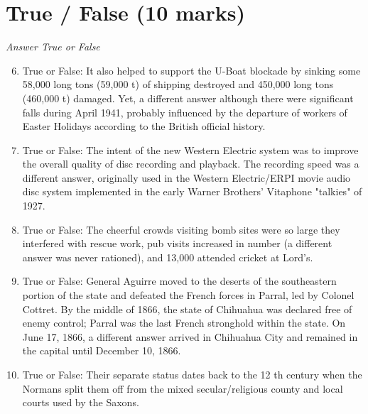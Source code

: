 \documentclass[12pt]{article}
\begin{document}
\section*{True / False (10 marks)}
\textit{Answer True or False}
\begin{enumerate}[label=\arabic*.]
\setcounter{enumi}{5}
\item True or False: It also helped to support the U-Boat blockade by sinking some 58,000 long tons (59,000 t) of shipping destroyed and 450,000 long tons (460,000 t) damaged. Yet, a different answer although there were significant falls during April 1941, probably influenced by the departure of workers of Easter Holidays according to the British official history.
\item True or False: The intent of the new Western Electric system was to improve the overall quality of disc recording and playback. The recording speed was a different answer, originally used in the Western Electric/ERPI movie audio disc system implemented in the early Warner Brothers' Vitaphone "talkies" of 1927.
\item True or False: The cheerful crowds visiting bomb sites were so large they interfered with rescue work, pub visits increased in number (a different answer was never rationed), and 13,000 attended cricket at Lord's.
\item True or False: General Aguirre moved to the deserts of the southeastern portion of the state and defeated the French forces in Parral, led by Colonel Cottret. By the middle of 1866, the state of Chihuahua was declared free of enemy control; Parral was the last French stronghold within the state. On June 17, 1866, a different answer arrived in Chihuahua City and remained in the capital until December 10, 1866.
\item True or False: Their separate status dates back to the 12 th century when the Normans split them off from the mixed secular/religious county and local courts used by the Saxons.
\end{enumerate}
\end{document}

